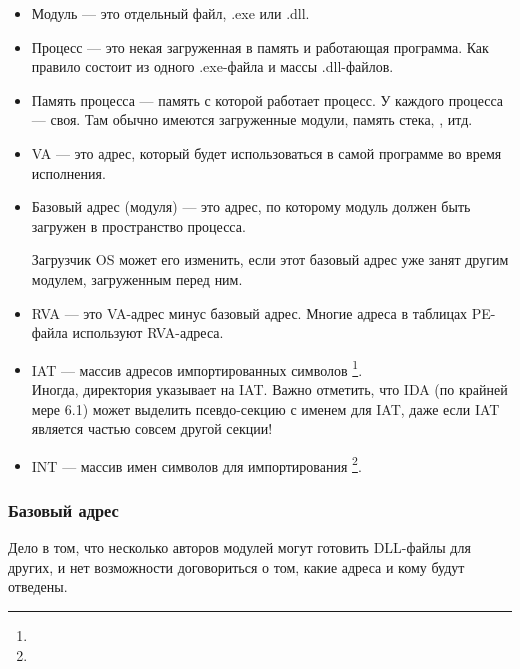 \begin{itemize}
\item
Модуль --- это отдельный файл, .exe или .dll.

\item Процесс --- это некая загруженная в память и работающая программа.
Как правило состоит из одного .exe-файла и массы .dll-файлов.

\item Память процесса --- память с которой работает процесс.
У каждого процесса --- своя.
Там обычно имеются загруженные модули, память стека, , итд.

\item
{}
\ac{VA} --- это адрес, который будет использоваться в самой программе во время исполнения.

\item
{}
Базовый адрес (модуля) --- это адрес, по которому модуль должен быть загружен в пространство процесса.

Загрузчик \ac{OS} может его изменить, если этот базовый адрес уже занят другим модулем, загруженным перед ним.

\item
{}
\ac{RVA} --- это \ac{VA}-адрес минус базовый адрес. Многие адреса в таблицах PE-файла используют \ac{RVA}-адреса.


\item 
{}
\ac{IAT} --- массив адресов импортированных символов \footnote{\PietrekPE}. \\
Иногда, директория  указывает на \ac{IAT}. 
\label{IDA_idata} Важно отметить, что \ac{IDA} (по крайней мере 6.1) может выделить псевдо-секцию с именем  для \ac{IAT}, даже если \ac{IAT} является частью совсем другой секции!

\item 
{}
\ac{INT} --- массив имен символов для импортирования \footnote{\PietrekPE}.
\end{itemize}

\subsubsection{Базовый адрес}

Дело в том, что несколько авторов модулей могут готовить DLL-файлы для других, и нет возможности договориться о том, какие адреса и кому будут отведены.

